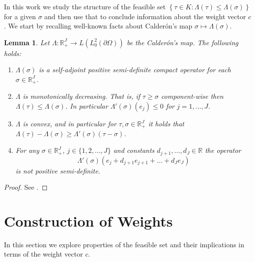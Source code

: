 \documentclass{article}
\newtheorem{lemma}[theorem]{Lemma}
\theoremstyle{definition}
\theoremstyle{remark}
\renewcommand{\leq}{\leqslant}
\renewcommand{\geq}{\geqslant}
\begin{document}
In this work we study the structure of the feasible set $\left\{\tau\in K: \Lambda(\tau)\leq\Lambda(\sigma)\right\}$ for a given $\sigma$ and then use that to conclude information about the weight vector $c$.
We start by recalling well-known facts about Calder\'on's map $\sigma\mapsto\Lambda(\sigma)$.

\begin{lemma}\label{lm:harrach}
Let $\Lambda:\mathbb R^J_+ \to L(L^2_0(\partial\Omega))$ be the Calder\'on's map.
The following holds:
\begin{enumerate}
\item $\Lambda(\sigma)$ is a self-adjoint positive semi-definite compact operator for each $\sigma\in\mathbb R^J_+$.\label{it:selfadjointness}
\item $\Lambda$ is monotonically decreasing. That is, if $\tau\geq\sigma$ component-wise then $\Lambda(\tau)\leq\Lambda(\sigma)$.
In particular $\Lambda'(\sigma)(e_j)\leq0$ for $j=1,\dots,J$.\label{it:monotonicity}
\item $\Lambda$ is convex, and in particular for $\tau,\sigma\in\mathbb R^J_+$ it holds that $\Lambda(\tau)-\Lambda(\sigma)\geq \Lambda'(\sigma)(\tau-\sigma)$.\label{it:convexity}
\item For any $\sigma\in\mathbb R^J_+$, $j\in \{1,2,\dots,J\}$ and constants $d_{j+1},\dots,d_J\in\mathbb R$ the operator
$$\Lambda'(\sigma)\left(e_j + d_{j+1}e_{j+1}+ \dots + d_J e_J\right)$$
is not positive semi-definite.\label{it:localizedpotentials}
\end{enumerate}
\end{lemma}
\begin{proof}
See \cite{convexcalderon}.
\end{proof}

\section*{Construction of Weights}
In this section we explore properties of the feasible set and their implications in terms of the weight vector $c$.
\end{document}
